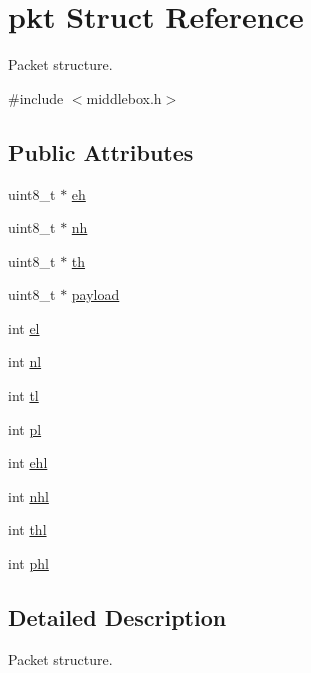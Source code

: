 \hypertarget{structpkt}{\section{pkt Struct Reference}
\label{structpkt}
}


Packet structure.  




{\ttfamily \#include $<$middlebox.\-h$>$}

\subsection*{Public Attributes}
\begin{DoxyCompactItemize}
\item 
uint8\-\_\-t $\ast$ \hyperlink{structpkt_ade4eeb65427ac816b5cac5a8cb3ae69e}{eh}
\item 
uint8\-\_\-t $\ast$ \hyperlink{structpkt_aea852a33d098462380781546cd19bf1f}{nh}
\item 
uint8\-\_\-t $\ast$ \hyperlink{structpkt_a5ebbe76e5d11cb6414429b60fe92146c}{th}
\item 
uint8\-\_\-t $\ast$ \hyperlink{structpkt_aa213efd0a76015d65f6f4ba745e49d99}{payload}
\item 
int \hyperlink{structpkt_a10a6c3fee7f10d921e69cc110affce1a}{el}
\item 
int \hyperlink{structpkt_add67017449f875df4752e40b3d10eda7}{nl}
\item 
int \hyperlink{structpkt_a669c31685e5eb281e5b40e59bdc3218d}{tl}
\item 
int \hyperlink{structpkt_ab298557ecf4db28c7e7cffa2fd72779a}{pl}
\item 
int \hyperlink{structpkt_a8613fb0e3a55e94f5c3a901e293797b6}{ehl}
\item 
int \hyperlink{structpkt_aae31018cd81255ca1114f0830e839cd3}{nhl}
\item 
int \hyperlink{structpkt_a240625d5ce4002682cec58d51a92f908}{thl}
\item 
int \hyperlink{structpkt_af6de953e144105f8774169652ac73204}{phl}
\end{DoxyCompactItemize}


\subsection{Detailed Description}
Packet structure. 

